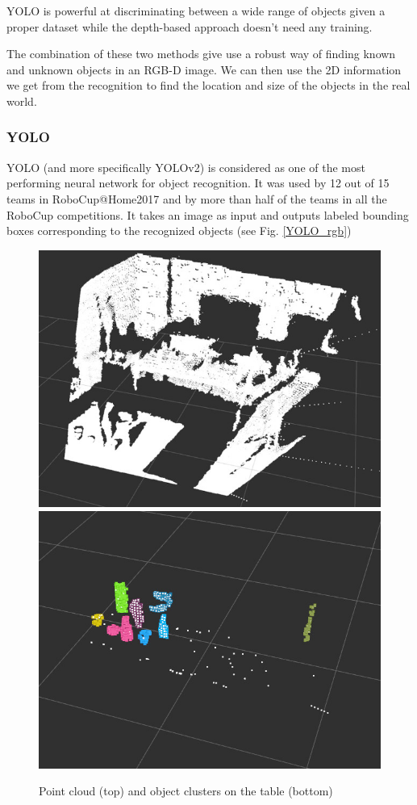 \documentclass[a4paper, twocolumn]{article}
\begin{document}
  YOLO is powerful at discriminating between a wide range of objects given a proper dataset while the depth-based approach doesn't need any training.

  The combination of these two methods give use a robust way of finding  known and unknown objects in an RGB-D image. We can then use the 2D information we get from the recognition to find the location and size of the objects in the real world.

    \subsubsection{YOLO}

    YOLO (and more specifically YOLOv2) is considered as one of the most performing neural network for object recognition. It was used by 12 out of 15 teams in RoboCup@Home2017 and by more than half of the teams in all the RoboCup competitions. It takes an image as input and outputs labeled bounding boxes corresponding to the recognized objects (see Fig. \ref{YOLO_rgb})

    \begin{figure}
        \includegraphics[width=\columnwidth]{../img/table_pcl.jpg}
        \includegraphics[width=\columnwidth]{../img/cluster_obj_pcl.jpg}
        \caption{Point cloud (top) and object clusters on the table (bottom)}
        \label{pcl_clust}
    \end{figure}
\end{document}
